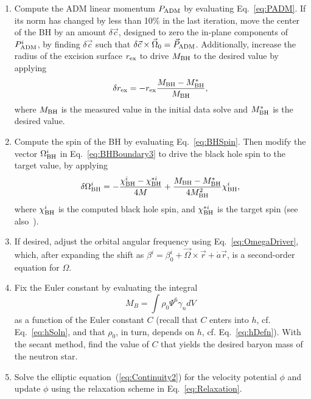 \begin{enumerate}
\item Compute the ADM linear momentum $P_{\rm ADM}$ by evaluating Eq.~\ref{eq:PADM}.
If its norm has changed by less than 10\% in the last iteration, move
the center of the BH by an amount $\delta\vec{c}$, designed to zero the in-plane components of $P^i_{\rm ADM}$, by finding $\delta \vec{c}$ such that $\delta\vec{c}
\times \vec{\Omega}_0=\vec{P}_{\rm ADM}$. Additionally, increase the
radius of the excision surface $r_{\rm ex}$ to
drive $M_{\rm BH}$ to the desired value by applying~\citep{Buchman:2012dw}
\begin{equation}
\delta r_{\rm ex} = -r_{\rm ex} \frac{M_{\rm BH} - M_{\rm
    BH}^{*}}{M_{\rm BH}},
\end{equation}
where $M_{\rm BH}$ is the measured value in the initial data solve and
$M_{\rm BH}^{*}$ is the desired value.

\item \label{it:OmegaUpdate} Compute the spin of the BH by evaluating Eq.~\ref{eq:BHSpin}. Then
  modify the vector $\Omega^i_{\rm BH}$ in Eq.~\ref{eq:BHBoundary3} to drive
  the black hole spin to the target value,  by applying~\citep{Buchman:2012dw}
\begin{equation}
\delta \Omega_{\rm BH}^i = -\frac{\chi^i_{\rm BH}-\chi_{\rm
    BH}^{*i}}{4M}+\frac{M_{\rm BH}-M_{\rm BH}^{*}}{4M_{\rm
    BH}^2}\chi_{\rm BH}^i,
\end{equation}
where $\chi^i_{\rm BH}$ is the computed black hole spin, and $\chi_{\rm
    BH}^{*i}$ is the target spin (see also~\citep{Ossokine:2015yla}).

\item
\label{it:omega}
 If desired, adjust the orbital angular frequency using
  Eq.~\ref{eq:OmegaDriver}, which, after expanding the shift as 
$\beta^i=\beta^i_0 +
\vec{\Omega}\times\vec{r} + \dot{a}\vec{r}$, is a second-order
equation for $\Omega$.

\item Fix the Euler constant by evaluating the integral
\begin{equation}
M_{B}=\int \rho_0\Psi^6\gamma_ndV
\end{equation}
as a function of the Euler
constant $C$ (recall that $C$ enters into $h$, cf. Eq.~\ref{eq:hSoln}, and that $\rho_0$, in turn, depends on $h$, cf. Eq.~\ref{eq:hDefn}). With the secant method, find the value of $C$ that yields the desired baryon mass of the neutron star.

\item Solve the elliptic equation~(\ref{eq:Continuity2}) for the velocity potential $\phi$
  and update $\phi$ using the relaxation scheme in Eq.~\ref{eq:Relaxation}.
  

\end{enumerate}
